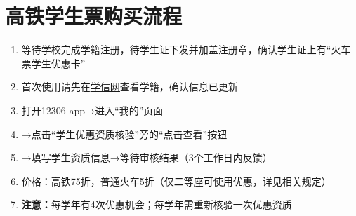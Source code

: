 \section[高铁学生票购买流程]{高铁学生票\footnotemark 购买流程}
\begin{enumerate}
      \item 等待学校完成学籍注册，待学生证下发并加盖注册章，确认学生证上有“火车票学生优惠卡”
      \item 首次使用请先在\uline{\href{https://www.chsi.com.cn/}{学信网}}查看学籍，确认信息已更新
      \item 打开12306 app→进入“我的”页面
      \item →点击“学生优惠资质核验”旁的“点击查看”按钮
      \item →填写学生资质信息→等待审核结果（3个工作日内反馈）
      \item 价格：高铁75折，普通火车5折（仅二等座可使用优惠，详见相关规定）
      \item \textbf{注意：}每学年\footnotemark 有4次优惠机会；每学年需重新核验一次优惠资质
\end{enumerate}

